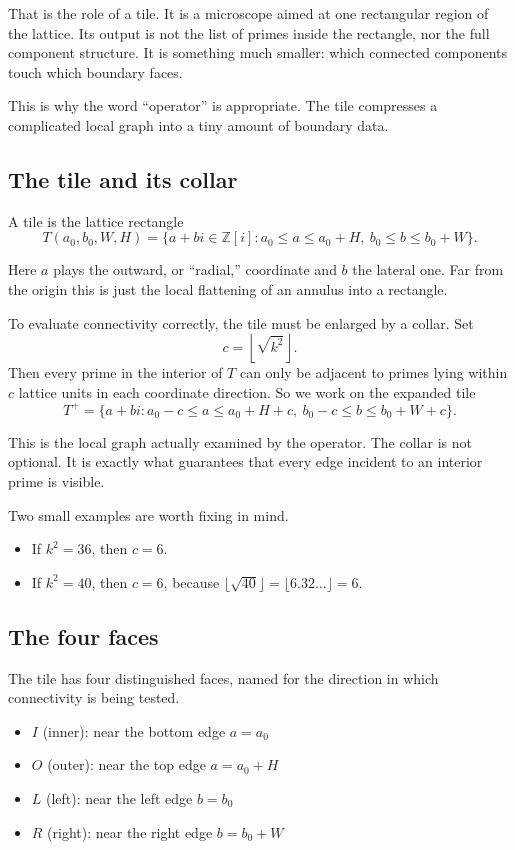 \documentclass[12pt,letterpaper]{article}
\theoremstyle{definition}
\theoremstyle{remark}
\newcommand{\Zi}{\mathbb{Z}[i]}
\newcommand{\Tplus}{T^+}
\begin{document}
That is the role of a tile. It is a microscope aimed at one rectangular region of the lattice. Its output is not the list of primes inside the rectangle, nor the full component structure. It is something much smaller: which connected components touch which boundary faces.

This is why the word ``operator'' is appropriate. The tile compresses a complicated local graph into a tiny amount of boundary data.

\subsection{The tile and its collar}

A tile is the lattice rectangle
\[
T(a_0,b_0,W,H)
=
\{a+bi\in\Zi : a_0\le a\le a_0+H,\ b_0\le b\le b_0+W\}.
\]

Here $a$ plays the outward, or ``radial,'' coordinate and $b$ the lateral one. Far from the origin this is just the local flattening of an annulus into a rectangle.

To evaluate connectivity correctly, the tile must be enlarged by a collar. Set
\[
c=\left\lfloor \sqrt{k^2}\right\rfloor.
\]
Then every prime in the interior of $T$ can only be adjacent to primes lying within $c$ lattice units in each coordinate direction. So we work on the expanded tile
\[
\Tplus
=
\{a+bi : a_0-c\le a\le a_0+H+c,\ b_0-c\le b\le b_0+W+c\}.
\]

This is the local graph actually examined by the operator. The collar is not optional. It is exactly what guarantees that every edge incident to an interior prime is visible.

Two small examples are worth fixing in mind.

\begin{itemize}
\item If $k^2=36$, then $c=6$.
\item If $k^2=40$, then $c=6$, because $\lfloor\sqrt{40}\rfloor=\lfloor 6.32\ldots\rfloor=6$.
\end{itemize}

\subsection{The four faces}

The tile has four distinguished faces, named for the direction in which connectivity is being tested.

\begin{itemize}
\item $I$ (inner): near the bottom edge $a=a_0$
\item $O$ (outer): near the top edge $a=a_0+H$
\item $L$ (left): near the left edge $b=b_0$
\item $R$ (right): near the right edge $b=b_0+W$
\end{itemize}
\end{document}
